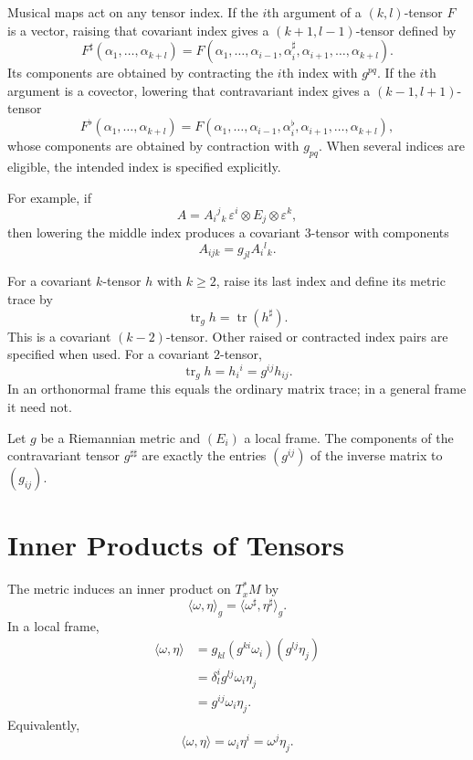 Musical maps act on any tensor index. If the $i$th argument of a $(k,l)$-tensor
$F$ is a vector, raising that covariant index gives a $(k+1,l-1)$-tensor defined by
\[
F^\sharp(\alpha_1,\ldots,\alpha_{k+l})
=F(\alpha_1,\ldots,\alpha_{i-1},\alpha_i^\sharp,
   \alpha_{i+1},\ldots,\alpha_{k+l}).
\]
Its components are obtained by contracting the $i$th index with $g^{pq}$. If the
$i$th argument is a covector, lowering that contravariant index gives a
$(k-1,l+1)$-tensor
\[
F^\flat(\alpha_1,\ldots,\alpha_{k+l})
=F(\alpha_1,\ldots,\alpha_{i-1},\alpha_i^\flat,
   \alpha_{i+1},\ldots,\alpha_{k+l}),
\]
whose components are obtained by contraction with $g_{pq}$. When several indices
are eligible, the intended index is specified explicitly.

For example, if
\[
A=A_i{}^j{}_k\,\varepsilon^i\otimes E_j\otimes\varepsilon^k,
\]
then lowering the middle index produces a covariant $3$-tensor with components
\[
A_{ijk}=g_{jl}A_i{}^l{}_k.
\]

For a covariant $k$-tensor $h$ with $k\ge2$, raise its last index and define its
metric trace by
\[
\operatorname{tr}_gh=\operatorname{tr}(h^\sharp).
\]
This is a covariant $(k-2)$-tensor. Other raised or contracted index pairs are
specified when used. For a covariant $2$-tensor,
\[
\operatorname{tr}_gh=h_i{}^i=g^{ij}h_{ij}.
\]
In an orthonormal frame this equals the ordinary matrix trace; in a general frame
it need not.

\begin{proposition}
\label{prop:inverse-metric-ambiguity}


Let $g$ be a Riemannian metric and $(E_i)$ a local frame. The components of
the contravariant tensor $g^{\sharp\sharp}$ are exactly the entries $(g^{ij})$
of the inverse matrix to $(g_{ij})$.
\end{proposition}

\section{Inner Products of Tensors}

The metric induces an inner product on $T_x^*M$ by
\[
\langle\omega,\eta\rangle_g
=\langle\omega^\sharp,\eta^\sharp\rangle_g.
\]
In a local frame,
\begin{align*}
\langle\omega,\eta\rangle
&=g_{kl}(g^{ki}\omega_i)(g^{lj}\eta_j)\\
&=\delta_l^i g^{lj}\omega_i\eta_j\\
&=g^{ij}\omega_i\eta_j.
\end{align*}
Equivalently,
\[
\langle\omega,\eta\rangle=\omega_i\eta^i=\omega^j\eta_j.
\]

